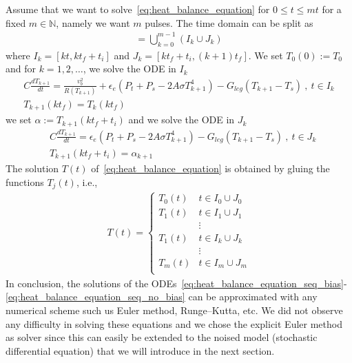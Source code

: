Assume that we want to solve~\eqref{eq:heat_balance_equation} for $0 \le t \le m t$ for a fixed $m \in \mathbb{N}$, namely we want $m$ pulses. The time domain can be split as
\begin{align*}
 [0, m t_f] = \bigcup_{k=0}^{m-1} (I_k \cup J_k)
\end{align*}
where $I_k=[k t, k t_f+t_i]$ and $J_k = [k t_f + t_i, (k+1)t_f]$.
We set $T_0(0):=T_0$ and for $k=1, 2, \dots$, we solve the ODE in $I_k$
\begin{align} \label{eq:heat_balance_equation_seq_bias}
& C\frac{dT_{k+1}}{dt}=\frac{v_b^2}{R(T_{k+1})}+\epsilon_e(P_t+P_s -2A\sigma T_{k+1}^4)-G_{leg}(T_{k+1}-T_s) \ , \ t \in I_k \nonumber \\
& T_{k+1}(kt_f)=T_{k}(kt_f)&
\end{align}
we set $\alpha:=T_{k+1}(kt_f+t_i)$ and we solve the ODE in $J_k$
\begin{align} \label{eq:heat_balance_equation_seq_no_bias}
& C\frac{dT_{k+1}}{dt}=\epsilon_e(P_t+P_s -2A\sigma T_{k+1}^4)-G_{leg}(T_{k+1}-T_s) \ , \ t \in J_k \nonumber \\
&T_{k+1}(kt_f+t_i)=\alpha_{k+1}
\end{align}
The solution $T(t)$ of~\eqref{eq:heat_balance_equation} is obtained by gluing the functions $T_j(t)$, i.e.,
\begin{align*}
 T(t) =
 \begin{cases}
  T_0(t) & t \in I_0 \cup J_0	\\
  T_1(t) & t \in I_1 \cup J_1	\\
	 & \vdots 		\\
  T_1(t) & t \in I_k \cup J_k	\\
	 & \vdots		\\
  T_m(t) & t \in I_m \cup J_m	\\
 \end{cases}
\end{align*}
In conclusion, the solutions of the ODEs~\eqref{eq:heat_balance_equation_seq_bias}-\eqref{eq:heat_balance_equation_seq_no_bias} can be approximated with any numerical scheme such us Euler method, Runge--Kutta, etc. We did not observe any difficulty in solving these equations and we chose the explicit Euler method as solver since this can easily be extended to the noised model (stochastic differential equation) that we will introduce in the next section.


